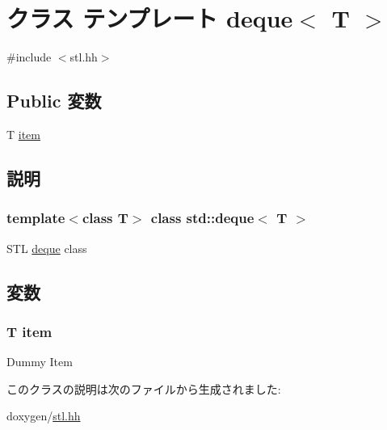 \hypertarget{classstd_1_1deque}{
\section{クラス テンプレート deque$<$ T $>$}
\label{classstd_1_1deque}
}


{\ttfamily \#include $<$stl.hh$>$}\subsection*{Public 変数}
\begin{DoxyCompactItemize}
\item 
T \hyperlink{classstd_1_1deque_aaeb0f0ed34c31a834ce36fe4defd6c5e}{item}
\end{DoxyCompactItemize}


\subsection{説明}
\subsubsection*{template$<$class T$>$ class std::deque$<$ T $>$}

STL \hyperlink{classstd_1_1deque}{deque} class 

\subsection{変数}
\hypertarget{classstd_1_1deque_aaeb0f0ed34c31a834ce36fe4defd6c5e}{
\subsubsection[{item}]{\setlength{\rightskip}{0pt plus 5cm}T {\bf item}}}
\label{classstd_1_1deque_aaeb0f0ed34c31a834ce36fe4defd6c5e}
Dummy Item 

このクラスの説明は次のファイルから生成されました:\begin{DoxyCompactItemize}
\item 
doxygen/\hyperlink{stl_8hh}{stl.hh}\end{DoxyCompactItemize}
